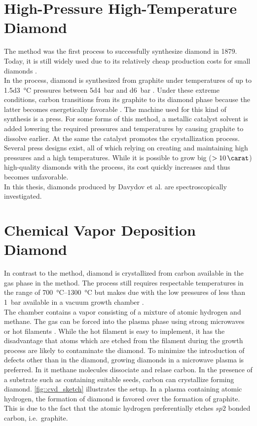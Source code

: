 \section[HPHT]{High-Pressure High-Temperature Diamond}\label{sec::hpht}

	The \HPHT method was the first process to successfully synthesize diamond in 1879.
	Today, it is still widely used due to its relatively cheap production costs for small diamonds \cite{wikiSyntheticDiamond}.
	\\
	In the \HPHT process, diamond is synthesized from graphite under temperatures of up to \SI{1.5d3}{\celsius} pressures between \SI{5d4}{bar} and \SI{d6}{bar} \cite{davis1993diamond}. Under these extreme conditions, carbon transitions from its graphite to its diamond phase because the latter becomes energetically favorable \cite{janine::135, janine::136, janine::137, janine::138}.
	The machine used for this kind of synthesis is a press.
	For some forms of this method, a metallic catalyst solvent is added lowering the required pressures and temperatures by causing graphite to dissolve earlier. At the same the catalyst promotes the crystallization process.
	Several press designs exist, all of which relying on creating and maintaining high pressures and a high temperatures.
	While it is possible to grow big ($> \SI{10}{\carat}$) high-quality diamonds with the \HPHT process, its cost quickly increases and thus becomes unfavorable.
	\\
	In this thesis, \HPHT \nds diamonds produced by Davydov et al. \cite{Davydov2014} are spectroscopically investigated.


\section[CVD]{Chemical Vapor Deposition Diamond}\label{sec::cvd}




	In contrast to the \HPHT method, diamond is crystallized from carbon available in the gas phase in the \CVD method.
	The process still requires respectable temperatures in the range of \SIrange{700}{1300}{\celsius} but makes due with the low pressures of less than \SI{1}{\bar} available in a vacuum growth chamber \cite{janine::141}.
	\\
	The chamber contains a vapor consisting of a mixture of atomic hydrogen and methane. The gas can be forced into the plasma phase using strong microwaves or hot filaments \cite{neu::75, neu::78, neu::79}. While the hot filament is easy to implement, it has the disadvantage that atoms which are etched from the filament during the growth process are likely to contaminate the diamond. To minimize the introduction of defects other than \sivs in the diamond, growing diamonds in a microwave plasma is preferred. In it methane molecules dissociate and relase carbon. In the presence of a substrate such as \ir containing suitable seeds, carbon can crystallize forming diamond. \autoref{fig::cvd_sketch} illustrates the setup. In a plasma containing atomic hydrogen, the formation of diamond is favored over the formation of graphite. This is due to the fact that the atomic hydrogen preferentially etches $sp2$ bonded carbon, i.e.\ graphite.

